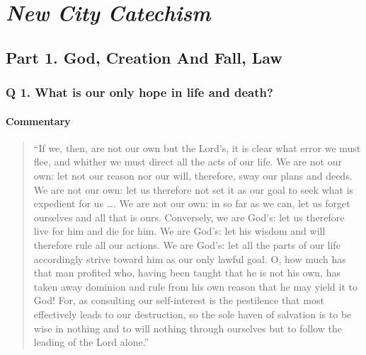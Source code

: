 \documentclass[00-main.tex]{subfiles}
\begin{document}
\mainmatter

\part{\em New City Catechism}

\chapter[Part 1. God, Creation And Fall, Law][God, Creation And Fall, Law]{Part 1. God, Creation And Fall, Law}

\section{Q  1. What is our only hope in life and death?}


\subsection{Commentary}
\begin{quote}
``If we, then, are not our own but the Lord's, it is clear what error we must flee, and whither we must direct all the acts of our life. We are not our own: let not our reason nor our will, therefore, sway our plans and deeds. We are not our own: let us therefore not set it as our goal to seek what is expedient for us \dots. We are not our own: in so far as we can, let us forget ourselves and all that is ours. Conversely, we are God's: let us therefore live for him and die for him. We are God's: let his wisdom and will therefore rule all our actions. We are God's: let all the parts of our life accordingly strive toward him as our only lawful goal. O, how much has that man profited who, having been taught that he is not his own, has taken away dominion and rule from his own reason that he may yield it to God! For, as consulting our self-interest is the pestilence that most effectively leads to our destruction, so the sole haven of salvation is to be wise in nothing and to will nothing through ourselves but to follow the leading of the Lord alone.''\end{quote}
\end{document}

